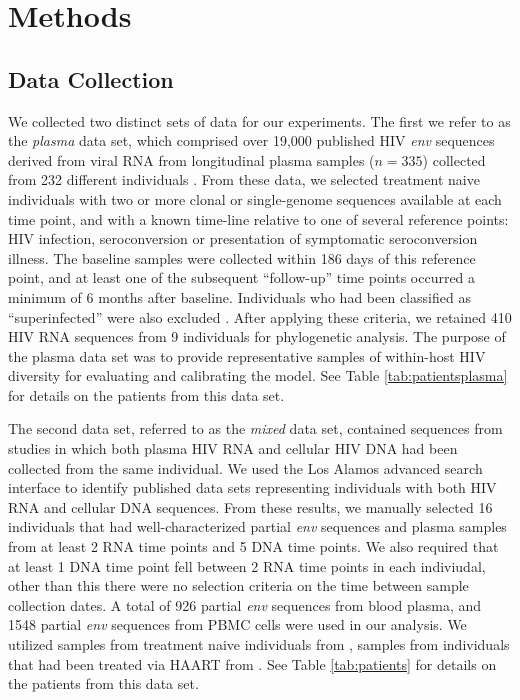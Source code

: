 \documentclass[12pt]{article}
\begin{document}

\section * {Methods} \label{sec:methods}



\subsection * {Data Collection} \label{subsec:dcollection}
We collected two distinct sets of data for our experiments. 
The first we refer to as the {\em plasma} data set, which comprised over 19,000 published HIV \textit{env} sequences derived from viral RNA from longitudinal plasma samples ($n=335$) collected from 232 different individuals \citep{McCloskey14}. 
From these data, we selected treatment naive individuals with two or more clonal or single-genome sequences available at each time point, and with a known time-line relative to one of several reference points: HIV infection, seroconversion or presentation of symptomatic seroconversion illness. 
The baseline samples were collected within 186 days of this reference point, and at least one of the subsequent ``follow-up'' time points occurred a minimum of 6 months after baseline.
Individuals who had been classified as ``superinfected'' were also excluded \citep{McCloskey14}.
After applying these criteria, we retained 410 HIV RNA sequences from 9 individuals for phylogenetic analysis.
The purpose of the plasma data set was to provide representative samples of within-host HIV diversity for evaluating and calibrating the model.
See Table \ref{tab:patientsplasma} for details on the patients from this data set.

The second data set, referred to as the {\em mixed} data set, contained sequences from studies in which both plasma HIV RNA and cellular HIV DNA had been collected from the same individual.
We used the Los Alamos advanced search interface \citep{LosAlamos} to identify published data sets representing individuals with both HIV RNA and cellular DNA sequences.
From these results, we manually selected 16 individuals that had well-characterized partial {\em env} sequences and plasma samples from at least 2 RNA time points and 5 DNA time points. 
We also required that at least 1 DNA time point fell between 2 RNA time points in each indiviudal, other than this there were no selection criteria on the time between sample collection dates. 
A total of 926 partial {\em env} sequences from blood plasma, and 1548 partial {\em env} sequences from PBMC cells were used in our analysis. 
We utilized samples from treatment naive individuals from \cite{Shankarappa99, Novitsky09}, samples from individuals that had been treated via HAART from \cite{Llewellyn06}.
See Table \ref{tab:patients} for details on the patients from this data set.
\end{document}
